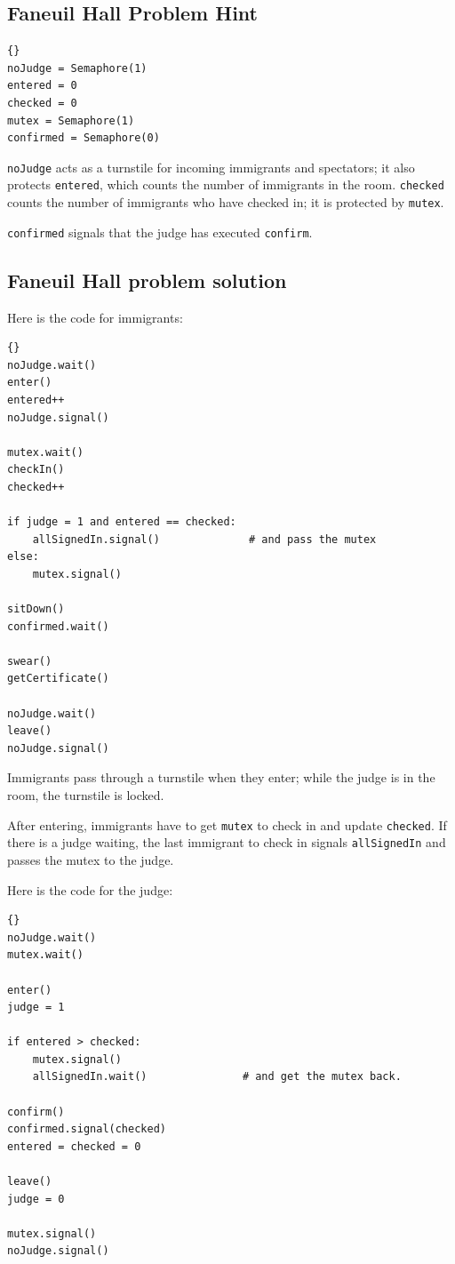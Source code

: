 \documentclass{book}
\newcommand{\clearemptydoublepage}{\newpage\cleardoublepage}
\begin{document}
\clearemptydoublepage
\subsection {Faneuil Hall Problem Hint}

\begin{lstlisting}[caption={Faneuil Hall problem hint}]{}
noJudge = Semaphore(1)
entered = 0
checked = 0
mutex = Semaphore(1)
confirmed = Semaphore(0)
\end{lstlisting}

{\tt noJudge} acts as a turnstile for incoming immigrants and
spectators; it also protects {\tt entered}, which counts the
number of immigrants in the room.  {\tt checked} counts the
number of immigrants who have checked in; it is protected by
{\tt mutex}.

{\tt confirmed} signals that the judge has executed {\tt confirm}.


\clearemptydoublepage
\subsection {Faneuil Hall problem solution}

Here is the code for immigrants:

\begin{lstlisting}[caption={Faneuil Hall problem solution (immigrant)}]{}
noJudge.wait()
enter()
entered++
noJudge.signal()

mutex.wait()
checkIn()
checked++

if judge = 1 and entered == checked:
    allSignedIn.signal()              # and pass the mutex
else:
    mutex.signal()

sitDown()
confirmed.wait()

swear()
getCertificate()

noJudge.wait()
leave()
noJudge.signal()
\end{lstlisting}

Immigrants pass through a turnstile when they enter; while the
judge is in the room, the turnstile is locked.

After entering, immigrants have to get {\tt mutex} to check 
in and update {\tt checked}.  If there is a judge waiting, the
last immigrant to check in signals {\tt allSignedIn} and passes
the mutex to the judge.

Here is the code for the judge:

\begin{lstlisting}[caption={Faneuil Hall problem solution (judge)}]{}
noJudge.wait()
mutex.wait()

enter()
judge = 1

if entered > checked:
    mutex.signal()
    allSignedIn.wait()               # and get the mutex back.

confirm()
confirmed.signal(checked)
entered = checked = 0

leave()
judge = 0

mutex.signal()
noJudge.signal()
\end{lstlisting}
\end{document}
